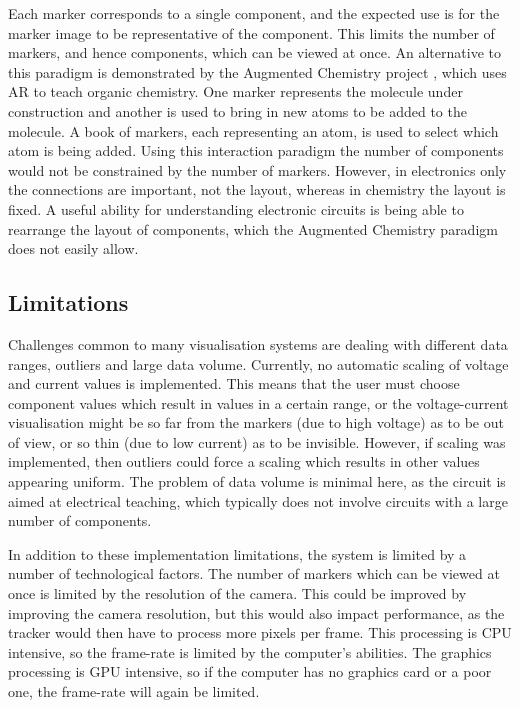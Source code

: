 Each marker corresponds to a single component, and the expected use is for the marker image to be representative of the component. This limits the number of markers, and hence components, which can be viewed at once. An alternative to this paradigm is demonstrated by the Augmented Chemistry project \cite{fjeld07}, which uses AR to teach organic chemistry. One marker represents the molecule under construction and another is used to bring in new atoms to be added to the molecule. A book of markers, each representing an atom, is used to select which atom is being added. Using this interaction paradigm the number of components would not be constrained by the number of markers. However, in electronics only the connections are important, not the layout, whereas in chemistry the layout is fixed. A useful ability for understanding electronic circuits is being able to rearrange the layout of components, which the Augmented Chemistry paradigm does not easily allow.

\subsection{Limitations}

Challenges common to many visualisation systems are dealing with different data ranges, outliers and large data volume. Currently, no automatic scaling of voltage and current values is implemented. This means that the user must choose component values which result in values in a certain range, or the voltage-current visualisation might be so far from the markers (due to high voltage) as to be out of view, or so thin (due to low current) as to be invisible. However, if scaling was implemented, then outliers could force a scaling which results in other values appearing uniform. The problem of data volume is minimal here, as the circuit is aimed at electrical teaching, which typically does not involve circuits with a large number of components.

In addition to these implementation limitations, the system is limited by a number of technological factors. The number of markers which can be viewed at once is limited by the resolution of the camera. This could be improved by improving the camera resolution, but this would also impact performance, as the tracker would then have to process more pixels per frame. This processing is CPU intensive, so the frame-rate is limited by the computer's abilities. The graphics processing is GPU intensive, so if the computer has no graphics card or a poor one, the frame-rate will again be limited.


